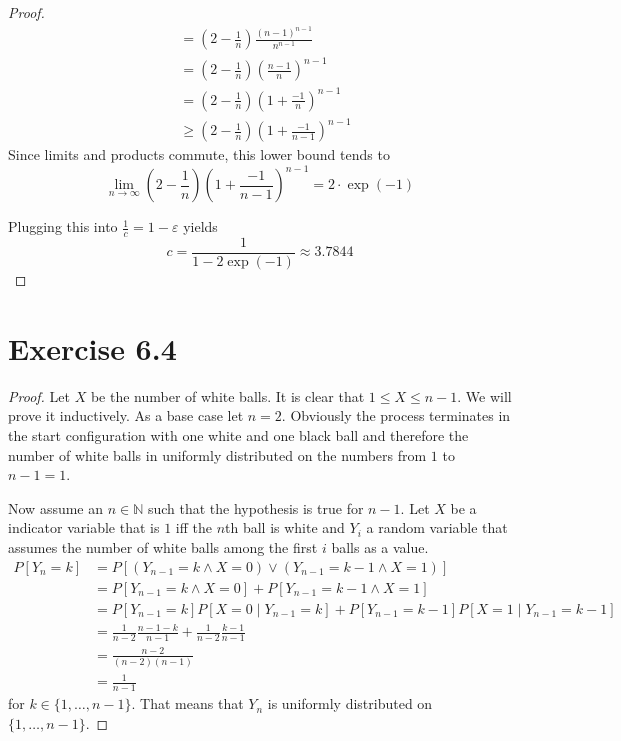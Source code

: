 \documentclass[10pt,a4paper]{article}
\begin{document}
\begin{proof}
\begin{align*}
                                                 & = \left( 2 - \frac{1}{n} \right) \frac{(n - 1)^{n - 1}}{n^{n - 1}}\\
                                                 & = \left( 2 - \frac{1}{n} \right) \left( \frac{n - 1}{n} \right)^{n - 1}\\
                                                 & = \left( 2 - \frac{1}{n} \right) \left( 1 + \frac{-1}{n} \right)^{n - 1}\\
                                                 & \ge \left( 2 - \frac{1}{n} \right) \left( 1 + \frac{-1}{n - 1} \right)^{n - 1}
  \end{align*}
  Since limits and products commute, this lower bound tends to
  \begin{equation*}
    \lim_{n \rightarrow \infty} \left( 2 - \frac{1}{n} \right) \left( 1 + \frac{-1}{n - 1} \right)^{n - 1} = 2 \cdot \exp(-1)
  \end{equation*}

  Plugging this into $\frac{1}{c} = 1 - \varepsilon$ yields
  \begin{equation*}
    c = \frac{1}{1 - 2 \exp(-1)} \approx 3.7844
  \end{equation*}
\end{proof}

\section*{Exercise 6.4}

\begin{proof}
  Let $X$ be the number of white balls.
  It is clear that $1 \le X \le n - 1$.
  We will prove it inductively.
  As a base case let $n = 2$.
  Obviously the process terminates in the start configuration with one white and one black ball and therefore the number of white balls in uniformly distributed on the numbers from $1$ to $n - 1 = 1$.

  Now assume an $n \in \mathbb{N}$ such that the hypothesis is true for $n - 1$.
  Let $X$ be a indicator variable that is $1$ iff the $n$th ball is white and $Y_{i}$ a random variable that assumes the number of white balls among the first $i$ balls as a value.
  \begin{align*}
    P[Y_{n} = k] & = P[(Y_{n - 1} = k \land X = 0) \lor (Y_{n - 1} = k - 1 \land X = 1)]\\
                 & = P[Y_{n - 1} = k \land X = 0] + P[Y_{n - 1} = k - 1 \land X = 1]\\
                 & = P[Y_{n - 1} = k] P[X = 0 \mid Y_{n - 1} = k] + P[Y_{n - 1} = k - 1] P[X = 1 \mid Y_{n - 1} = k - 1]\\
                 & = \frac{1}{n - 2} \frac{n - 1 - k}{n - 1} + \frac{1}{n - 2} \frac{k - 1}{n - 1}\\
                 & = \frac{n - 2}{(n - 2)(n - 1)}\\
                 & = \frac{1}{n - 1}
  \end{align*}
  for $k \in \{ 1, \dots, n - 1 \}$.
  That means that $Y_{n}$ is uniformly distributed on $\{ 1, \dots, n - 1 \}$.
\end{proof}
\end{document}

